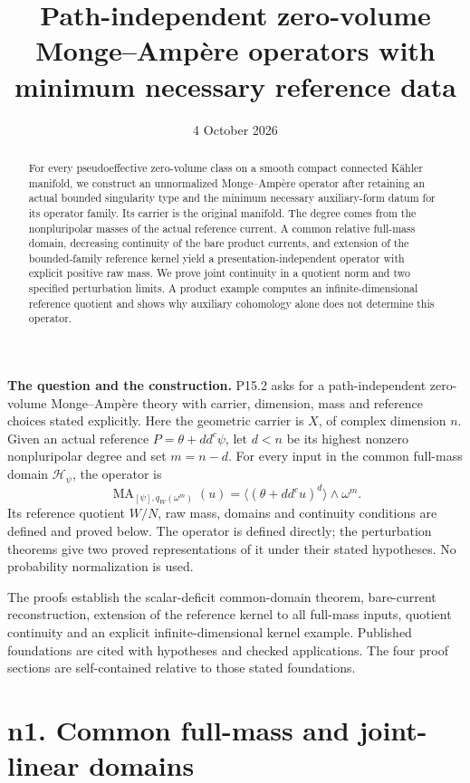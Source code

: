 \documentclass[
  11pt,
]{article}
\title{Path-independent zero-volume Monge--Amp\`ere operators
with minimum necessary reference data}
\author{}
\date{4 October 2026}
\begin{document}
\maketitle

\begin{abstract}
For every pseudoeffective zero-volume class on a smooth compact connected
K\"ahler manifold, we construct an unnormalized Monge--Amp\`ere operator
after retaining an actual bounded singularity type and the minimum
necessary auxiliary-form datum for its operator family. Its carrier is
the original manifold. The degree comes from the nonpluripolar masses
of the actual reference current. A common relative full-mass domain,
decreasing continuity of the bare product currents, and extension of the
bounded-family reference kernel yield a presentation-independent
operator with explicit positive raw mass. We prove joint continuity in
a quotient norm and two specified perturbation limits. A product
example computes an infinite-dimensional reference quotient and shows
why auxiliary cohomology alone does not determine this operator.
\end{abstract}

\textbf{The question and the construction.} P15.2 asks for a
path-independent zero-volume Monge--Amp\`ere theory with carrier,
dimension, mass and reference choices stated explicitly. Here the
geometric carrier is \(X\), of complex dimension \(n\). Given an actual
reference \(P=\theta+dd^c\psi\), let \(d<n\) be its highest nonzero
nonpluripolar degree and set \(m=n-d\). For every input in the common
full-mass domain \(\mathcal H_\psi\), the operator is
\[
  \operatorname{MA}_{[\psi],q_W(\omega^m)}(u)
    =\langle(\theta+dd^cu)^d\rangle\wedge\omega^m.
\]
Its reference quotient \(W/N\), raw mass, domains and continuity
conditions are defined and proved below. The operator is defined
directly; the perturbation theorems give two proved representations of
it under their stated hypotheses. No probability normalization is used.

The proofs establish the scalar-deficit common-domain theorem,
bare-current reconstruction, extension of the reference kernel to all
full-mass inputs, quotient continuity and an explicit
infinite-dimensional kernel example. Published foundations are cited
with hypotheses and checked applications. The four proof sections are
self-contained relative to those stated foundations.

\section{n1. Common full-mass and joint-linear
domains}\label{n1.-common-full-mass-and-joint-linear-domains}
\end{document}
